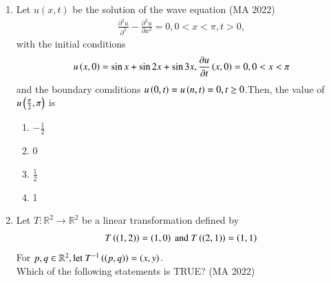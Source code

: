 \documentclass[journal,12pt,onecolumn]{IEEEtran}
\theoremstyle{remark}
\begin{document}
\begin{enumerate}
vectors in $\vec{OX}$ and $\vec{OY}$ directions, respectively, along the upper half of the circle $x^2+y^2=1$ from $\brak{1,0}$ to $\brak{-1,0}$ in the $xy-$plane is
\hfill{(MA 2022)}
\begin{multicols}{4}
\begin{enumerate}
\item $-\pi $
\item $-\frac{\pi}{2}$
\item $\frac{\pi}{2}$
\item $\pi$
\end{enumerate} 
\end{multicols}
\item Let $u(x, t)$ be the solution of the wave equation
\hfill{(MA 2022)}
\begin{align}
\frac{\partial^2u}{\partial^2} - \frac{\partial^2u}{\partial x^2} = 0,0<x<\pi,t>0, 
\end{align}
with the initial conditions
\begin{align}
u\left(x,0\right) = \sin{x}+\sin{2x}+\sin{3x},\frac{\partial u}{\partial t}\left(x,0\right) = 0, 0<x<\pi
\end{align}
and the boundary comditions $u\left(0, t\right) = u\left(n, t\right) = 0, t \geq 0$.Then, the value of $u\left(\frac{\pi}{2},\pi\right)$ is
\begin{multicols}{4}
\begin{enumerate}
\item $-\frac{1}{2}$
\item 0
\item $\frac{1}{2}$
\item 1
\end{enumerate}
\end{multicols}
\item Let $T : \mathbb{R}^2 \rightarrow \mathbb{R}^2$ be a linear transformation defined by
\begin{align}
T\left(\left(1,2\right)\right)=\left(1,0\right) \text{ and } T\left(\left(2,1\right)\right)=\left(1,1\right)
\end{align}
For $p,q \in \mathbb{R}^2,\text{let } T^{-1}\left(\left(p,q\right)\right)=\left(x,y\right)$.\\
Which of the following statements is TRUE?
\hfill{(MA 2022)}


\end{enumerate}
\end{document}
